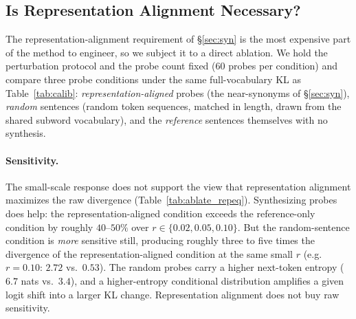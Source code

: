 \documentclass[11pt]{article}
\theoremstyle{definition}
\begin{document}
\subsection{Is Representation Alignment Necessary?}
\label{sec:exp:ablate}

The representation-alignment requirement of \S\ref{sec:syn} is the most
expensive part of the method to engineer, so we subject it to a direct ablation.
We hold the perturbation protocol and the probe count fixed ($60$ probes per
condition) and compare three probe conditions under the same full-vocabulary KL
as Table~\ref{tab:calib}: \emph{representation-aligned} probes (the
near-synonyms of \S\ref{sec:syn}), \emph{random} sentences (random token
sequences, matched in length, drawn from the shared subword vocabulary), and the
\emph{reference} sentences themselves with no synthesis.

\paragraph{Sensitivity.}
The small-scale response does not support the view that representation alignment
maximizes the raw divergence (Table~\ref{tab:ablate_repeq}). Synthesizing probes
does help: the representation-aligned condition exceeds the reference-only
condition by roughly $40$--$50\%$ over $r \in \{0.02,0.05,0.10\}$. But the
random-sentence condition is \emph{more} sensitive still, producing roughly
three to five times the divergence of the representation-aligned condition at
the same small $r$ (e.g.\ $r=0.10$: $2.72$ vs.\ $0.53$). The random probes carry
a higher next-token entropy ($6.7$ nats vs.\ $3.4$), and a higher-entropy
conditional distribution amplifies a given logit shift into a larger KL change.
Representation alignment does not buy raw sensitivity.
\end{document}

